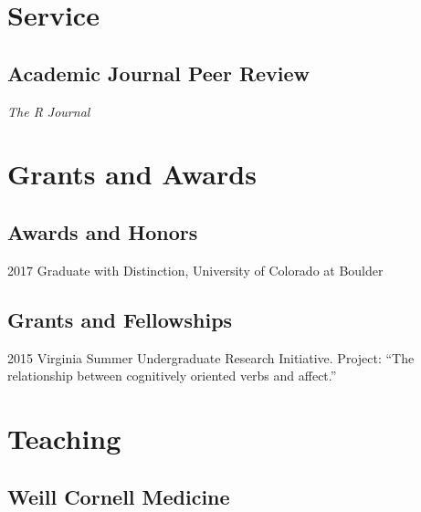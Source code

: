 \documentclass[12pt,letterpaper]{report}
\newcommand{\listitemspace}{0.15em}
\renewenvironment{itemize}
{\begin{list}{}{\setlength{\leftmargin}{0em}
            \setlength{\parskip}{0em}
            \setlength{\itemsep}{\listitemspace}
            \setlength{\parsep}{\listitemspace}}}
    {\end{list}}
\begin{document}
    \section*{Service}
    
    \subsection*{Academic Journal Peer Review}
    
    \begin{itemize}
    
    	\item \textit{The R Journal}
    
    \end{itemize}

    \section*{Grants and Awards}

    \subsection*{Awards and Honors}

    \begin{tablist}

        \item[2017] \tab Graduate with Distinction, University of Colorado at Boulder

    \end{tablist}

    \subsection*{Grants and Fellowships}

    \begin{tablist}

        \item[2015] \tab Virginia Summer Undergraduate Research Initiative. Project: \enquote{The relationship between cognitively oriented verbs and affect.}

    \end{tablist}

    \section*{Teaching}
    
    \subsection*{Weill Cornell Medicine}
    
\end{document}
